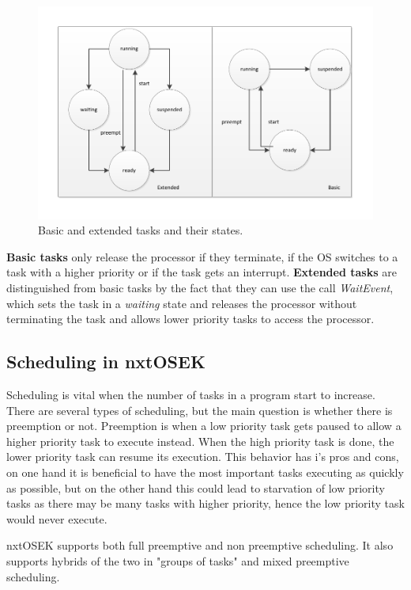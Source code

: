 \begin{figure}[hptb]
  \centering
    \includegraphics[width=1.0\textwidth]{img/taskstate.pdf}
  \caption{Basic and extended tasks and their states.}
  \label{taskstate}
\end{figure}

\textbf{Basic tasks} only release the processor if they terminate, if the OS switches to a task with a higher priority or if the task gets an interrupt.
\textbf{Extended tasks} are distinguished from basic tasks by the fact that they can use the call \emph{WaitEvent}, which sets the task in a \emph{waiting} state and releases the processor without terminating the task and allows lower priority tasks to access the processor.

\subsection{Scheduling in nxtOSEK} %
\label{sub:scheduling_in_nxtosek}
 Scheduling is vital when the number of tasks in a program start to increase. There are several types of scheduling, but the main question is whether there is preemption or not. Preemption is when a low priority task gets paused to allow a higher priority task to execute instead. When the high priority task is done, the lower priority task can resume its execution. This behavior has i's pros and cons, on one hand it is beneficial to have the most important tasks executing as quickly as possible, but on the other hand this could lead to starvation of low priority tasks as there may be many tasks with higher priority, hence the low priority task would never execute. 

nxtOSEK supports both full preemptive and non preemptive scheduling. It also supports hybrids of the two in "groups of tasks" and mixed preemptive scheduling.

